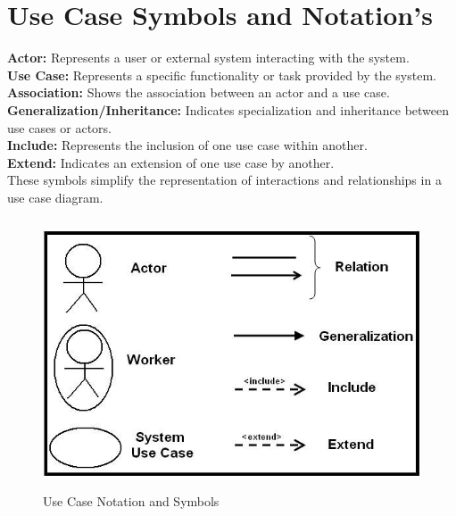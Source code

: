 \section{Use Case Symbols and Notation's}
\vspace{0.2cm}

\textbf{Actor:} Represents a user or external system interacting with the system.\\
\textbf{Use Case:} Represents a specific functionality or task provided by the system.\\
\textbf{Association:} Shows the association between an actor and a use case.\\
\textbf{Generalization/Inheritance:} Indicates specialization and inheritance between use cases or actors.\\
\textbf{Include:} Represents the inclusion of one use case within another.\\
\textbf{Extend:} Indicates an extension of one use case by another.\\
These symbols simplify the representation of interactions and relationships in a use case diagram.\\
\begin{figure}[ht]
    \centering   
    \includegraphics[width=\textwidth, height=8cm]{usecasediagram/Symbols-of-UML-Use-Case-diagram.jpg}
    \caption{Use Case Notation and Symbols}
    \label{fig:4.7}
\end{figure}